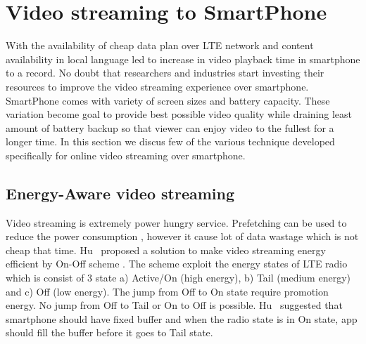 \section{Video streaming to SmartPhone}
With the availability of cheap data plan over LTE network and content availability in local language led to increase in video playback time in smartphone to a record. No doubt that researchers and industries start investing their resources to improve the video streaming experience over smartphone. SmartPhone comes with variety of screen sizes and battery capacity. These variation become goal to provide best possible video quality while draining least amount of battery backup so that viewer can enjoy video to the fullest for a longer time. In this section we discus few of the various technique developed specifically for online video streaming over smartphone.

\subsection{Energy-Aware video streaming}
Video streaming is extremely power hungry service. Prefetching can be used to reduce the power consumption \cite{6681586,10.1145/2079296.2079321}, however it cause lot of data wastage which is not cheap that time. Hu \etal\ proposed a solution to make video streaming energy efficient by On-Off scheme \cite{7218493}. The scheme exploit the energy states of LTE radio which is consist of 3 state a) Active/On (high energy), b) Tail (medium energy) and c) Off (low energy). The jump from Off to On state require promotion energy. No jump from Off to Tail or On to Off is possible. Hu \etal\ suggested that smartphone should have fixed buffer and when the radio state is in On state, app should fill the buffer before it goes to Tail state.

